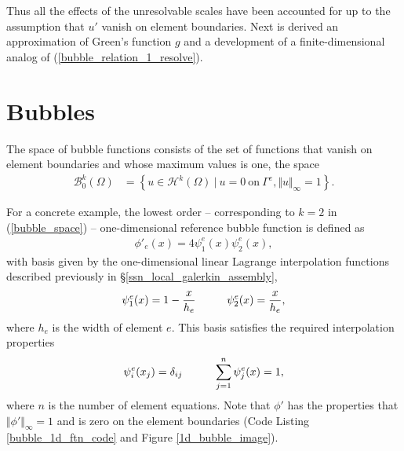 Thus all the effects of the unresolvable scales have been accounted for up to the assumption that $u'$ vanish on element boundaries.  Next is derived an approximation of Green's function $g$ and a development of a finite-dimensional analog of (\ref{bubble_relation_1_resolve}).


\section{Bubbles}

The space of bubble functions consists of the set of functions that vanish on element boundaries and whose maximum values is one, the space
\begin{align}
  \label{bubble_space}
  \mathcal{B}_0^k(\Omega) &= \left\{ u \in \mathcal{H}^k(\Omega)\ |\ u = 0\ \text{on}\ \Gamma^e, \Vert u \Vert_{\infty} = 1 \right\}.
\end{align}

For a concrete example, the lowest order -- corresponding to $k = 2$ in (\ref{bubble_space}) -- one-dimensional reference bubble function is defined as
\begin{align}
  \label{bubble_function}
  \phi'_e(x) = 4 \psi_1^e(x) \psi_2^e(x),
\end{align}
with basis given by the one-dimensional linear Lagrange interpolation functions described previously in \S \ref{ssn_local_galerkin_assembly}, 
\begin{align*}
  \psi_1^e(x) = 1 - \frac{x}{h_e} \hspace{10mm} \psi_2^e(x) = \frac{x}{h_e},
\end{align*}
where $h_e$ is the width of element $e$.  This basis satisfies the required interpolation properties
\begin{align*}
  \psi_i^e(x_j) = \delta_{ij} \hspace{10mm} \sum_{j=1}^n \psi_j^e(x) = 1,
\end{align*}
where $n$ is the number of element equations.  Note that $\phi'$ has the properties that $\Vert \phi' \Vert_{\infty} = 1$ and is zero on the element boundaries (Code Listing \ref{bubble_1d_ftn_code} and Figure \ref{1d_bubble_image}).

